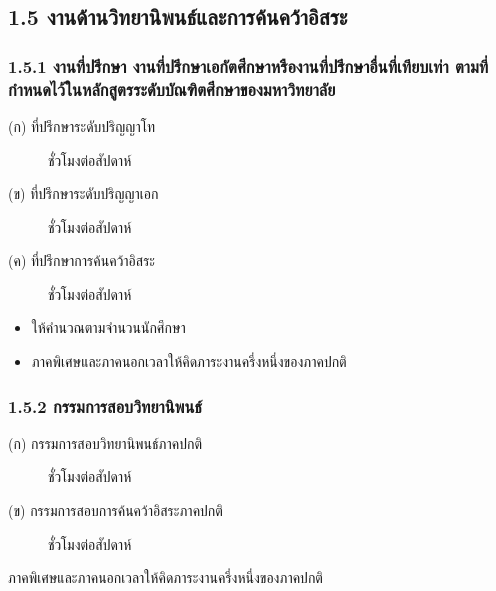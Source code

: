 \documentclass[a4paper,12pt,english]{sphinxmanual}
\begin{document}
\subsection{1.5 งานด้านวิทยานิพนธ์และการค้นคว้าอิสระ}
\label{\detokenize{workload_rubric:id18}}

\subsubsection{1.5.1 งานที่ปรึกษา งานที่ปรึกษาเอกัตศึกษาหรืองานที่ปรึกษาอื่นที่เทียบเท่า ตามที่กำหนดไว้ในหลักสูตรระดับบัณฑิตศึกษาของมหาวิทยาลัย}
\label{\detokenize{workload_rubric:id19}}\begin{description}
\item[{(ก) ที่ปรึกษาระดับปริญญาโท}]  ชั่วโมงต่อสัปดาห์

\item[{(ข) ที่ปรึกษาระดับปริญญาเอก}]  ชั่วโมงต่อสัปดาห์

\item[{(ค) ที่ปรึกษาการค้นคว้าอิสระ}]  ชั่วโมงต่อสัปดาห์

\end{description}
\begin{itemize}
\item {} 
ให้คำนวณตามจำนวนนักศึกษา

\item {} 
ภาคพิเศษและภาคนอกเวลาให้คิดภาระงานครึ่งหนึ่งของภาคปกติ

\end{itemize}


\subsubsection{1.5.2 กรรมการสอบวิทยานิพนธ์}
\label{\detokenize{workload_rubric:id20}}\begin{description}
\item[{(ก) กรรมการสอบวิทยานิพนธ์ภาคปกติ}]  ชั่วโมงต่อสัปดาห์

\item[{(ข) กรรมการสอบการค้นคว้าอิสระภาคปกติ}]  ชั่วโมงต่อสัปดาห์

\end{description}

ภาคพิเศษและภาคนอกเวลาให้คิดภาระงานครึ่งหนึ่งของภาคปกติ
\end{document}

